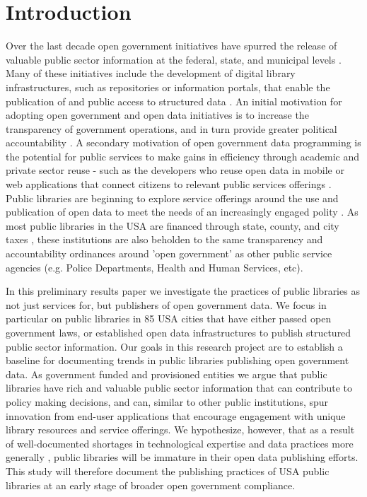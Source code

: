 \documentclass[sigconf]{acmart}
\begin{document}
\maketitle

\section{Introduction}
Over the last decade open government initiatives have spurred the release of valuable public sector information at the federal, state, and municipal levels \cite{chun2010government}. Many of these initiatives include the development of digital library infrastructures, such as repositories or information portals, that enable the publication of and public access to structured data \cite{kitchin2014data}. An initial motivation for adopting open government and open data initiatives is to increase the transparency of government operations, and in turn provide greater political accountability \cite{davies2012promises}. A secondary motivation of open government data programming is the potential for public services to make gains in efficiency through academic and private sector reuse - such as the developers who reuse open data in mobile or web applications that connect citizens to relevant public services offerings \cite{janssen2012benefits, yan2018mining}. Public libraries are beginning to explore service offerings around the use and publication of open data to meet the needs of an increasingly engaged polity  \cite{allen2017strategic}. As most public libraries in the USA are financed through state, county, and city taxes \cite{molz1999civic}, these institutions are also beholden to the same transparency and accountability ordinances around 'open government' as other public service agencies (e.g. Police Departments, Health and Human Services, etc).

In this preliminary results paper we investigate the practices of public libraries as not just services for, but publishers of open government data. We focus in particular on public libraries in 85 USA cities that have either passed open government laws, or established open data infrastructures to publish structured public sector information. Our goals in this research project are to establish a baseline for documenting trends in public libraries publishing open government data. As government funded and provisioned entities we argue that public libraries have rich and valuable public sector information that can contribute to policy making decisions, and can, similar to other public institutions, spur innovation from end-user applications that encourage engagement with unique library resources and service offerings. We hypothesize, however, that as a result of well-documented shortages in technological expertise and data practices more generally \cite{curran2007taking}, public libraries will be immature in their open data publishing efforts. This study will therefore document the publishing practices of USA public libraries at an early stage of broader open government compliance.\\
\end{document}
